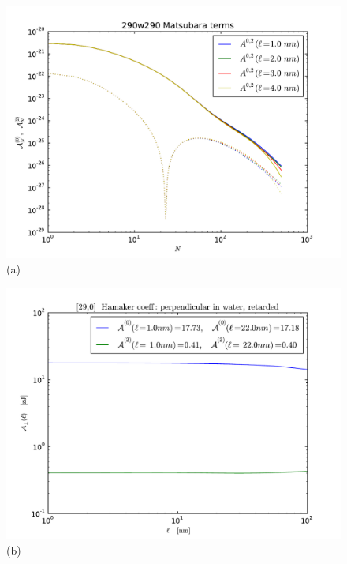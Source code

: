 \documentclass[onecolumn,letterpaper,amsmath,amssymb,floatfix,aps,superscriptaddress]{revtex4}
\begin{document}
\begin{figure}[t!]
\begin{center}
\begin{minipage}[b]{0.40\textwidth}
\begin{center}
\includegraphics[width=1.2\textwidth]{plots/290_A_vs_n.pdf} (a)
\end{center}
\end{minipage}
\hskip 43pt
\begin{minipage}[b]{0.40\textwidth}
\begin{center}
\includegraphics[width=1.2\textwidth]{plots/140322_290w290_HCs_perpendicular_ret.pdf} (b)
\end{center}

\end{minipage}
\end{center}
\end{figure}
\end{document}
